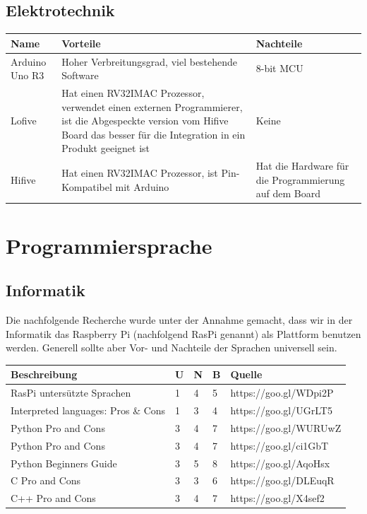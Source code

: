 \documentclass[a4paper]{report}
\begin{document}
\subsection{Elektrotechnik}
\vspace{1em}
\noindent
\begin{tabular}{|p{}|p{}|p{}|}
  \hline
  \textbf{Name} & \textbf{Vorteile} & \textbf{Nachteile} \\
  \hline
	Arduino Uno R3 & Hoher Verbreitungsgrad, viel bestehende Software & 8-bit MCU \\
	\hline
  Lofive & Hat einen RV32IMAC Prozessor, verwendet einen externen Programmierer, ist die Abgespeckte version vom Hifive Board das besser für die Integration in ein Produkt geeignet ist & Keine \\
  \hline
  Hifive & Hat einen RV32IMAC Prozessor, ist Pin-Kompatibel mit Arduino & Hat die Hardware für die Programmierung auf dem Board \\
  \hline
\end{tabular}
\section{Programmiersprache}


\subsection{Informatik}
Die nachfolgende Recherche wurde unter der Annahme gemacht, dass wir in der Informatik das Raspberry Pi (nachfolgend RasPi genannt) als Plattform benutzen werden. Generell sollte aber Vor- und Nachteile der Sprachen universell sein.

\vspace{1em}
\noindent
\begin{tabular}{|p{}|p{}|p{}|p{}|p{}|}
	\hline
	\textbf{Beschreibung} & \textbf{U} & \textbf{N} & \textbf{B} & \textbf{Quelle} \\
	\hline
	RasPi untersützte Sprachen & 1 & 4 & 5 & https://goo.gl/WDpi2P \\
	\hline
	Interpreted languages: Pros \& Cons & 1 & 3 & 4 & https://goo.gl/UGrLT5 \\
	\hline
	Python Pro and Cons & 3 & 4  & 7 & https://goo.gl/WURUwZ \\
	\hline
	Python Pro and Cons & 3 & 4 & 7 & https://goo.gl/ci1GbT \\
	\hline
	Python Beginners Guide & 3 & 5 & 8 & https://goo.gl/AqoHsx\\
	\hline
	C Pro and Cons & 3 & 3 & 6 & https://goo.gl/DLEuqR \\
	\hline
	C++ Pro and Cons & 3 & 4 & 7 & https://goo.gl/X4sef2\\
	\hline
\end{tabular}
\end{document}
